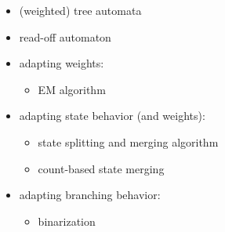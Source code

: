 \documentclass[beamer]{standalone}
\title{\jobname}
\begin{document}
\begin{standaloneframe}{\jobname}
	\only<+->{}
	\begin{itemize}[<1-|alert@+>]
	\item (weighted) tree automata
	\item read-off automaton
	\item adapting weights:
		\begin{itemize}[<1-|alert@.>]
		\item EM algorithm
		\end{itemize}
	\item adapting state behavior (and weights):
		\begin{itemize}[<1-|alert@.>]
		\item state splitting and merging algorithm
		\item count-based state merging
		\end{itemize}
	\item adapting branching behavior:
		\begin{itemize}[<1-|alert@.>]
		\item binarization
		\end{itemize}
	\end{itemize}
\end{standaloneframe}
\end{document}
